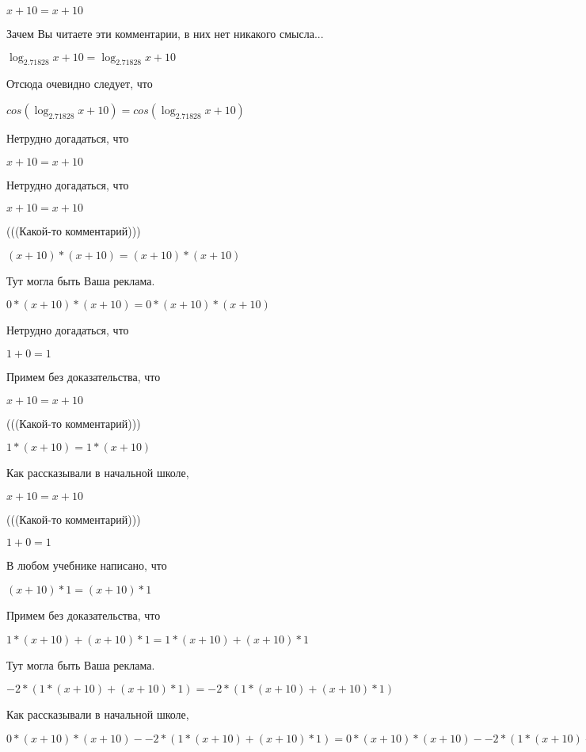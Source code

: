 \documentclass[12pt,a4paper,fleqn]{article}
\theoremstyle{definition}
\begin{document}
$ x  +  10  =  x  +  10 $

Зачем Вы читаете эти комментарии, в них нет никакого смысла... 

$\log_{ 2.71828 }{ x  +  10 } = \log_{ 2.71828 }{ x  +  10 }$

Отсюда очевидно следует, что 

$cos(\log_{ 2.71828 }{ x  +  10 }) = cos(\log_{ 2.71828 }{ x  +  10 })$

Нетрудно догадаться, что 

$ x  +  10  =  x  +  10 $

Нетрудно догадаться, что 

$ x  +  10  =  x  +  10 $

(((Какой-то комментарий))) 

$( x  +  10 ) * ( x  +  10 ) = ( x  +  10 ) * ( x  +  10 )$

Тут могла быть Ваша реклама. 

$ 0  * ( x  +  10 ) * ( x  +  10 ) =  0  * ( x  +  10 ) * ( x  +  10 )$

Нетрудно догадаться, что 

$ 1  +  0  =  1 $

Примем без доказательства, что 

$ x  +  10  =  x  +  10 $

(((Какой-то комментарий))) 

$ 1  * ( x  +  10 ) =  1  * ( x  +  10 )$

Как рассказывали в начальной школе, 

$ x  +  10  =  x  +  10 $

(((Какой-то комментарий))) 

$ 1  +  0  =  1 $

В любом учебнике написано, что 

$( x  +  10 ) *  1  = ( x  +  10 ) *  1 $

Примем без доказательства, что 

$ 1  * ( x  +  10 ) + ( x  +  10 ) *  1  =  1  * ( x  +  10 ) + ( x  +  10 ) *  1 $

Тут могла быть Ваша реклама. 

$ -2  * ( 1  * ( x  +  10 ) + ( x  +  10 ) *  1 ) =  -2  * ( 1  * ( x  +  10 ) + ( x  +  10 ) *  1 )$

Как рассказывали в начальной школе, 

$ 0  * ( x  +  10 ) * ( x  +  10 ) -  -2  * ( 1  * ( x  +  10 ) + ( x  +  10 ) *  1 ) =  0  * ( x  +  10 ) * ( x  +  10 ) -  -2  * ( 1  * ( x  +  10 ) + ( x  +  10 ) *  1 )$
\end{document}
